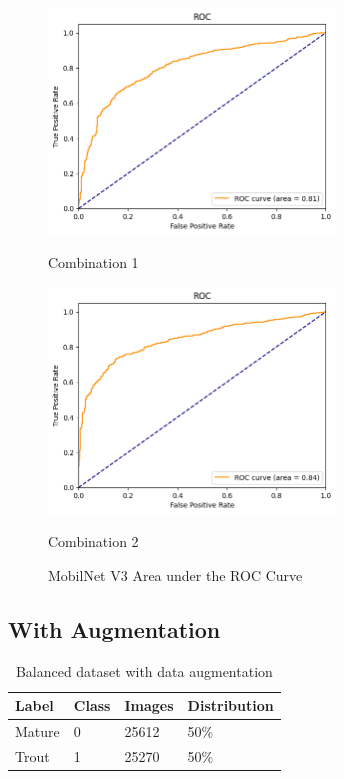 \begin{figure}[H]
    \centering
    \begin{minipage}[b]{0.49\textwidth}
        \centering
        \includegraphics[width=\textwidth, height=6cm]{Figures/balanced_data/less_data/withoutbn/mn3/roc.png}
        \captionsetup{labelformat=empty}
        \caption{Combination 1}
        \label{fig:u_wo_r_roc}
    \end{minipage}
    \hfill
    \begin{minipage}[b]{0.49\textwidth}
        \centering
        \includegraphics[width=\textwidth, height=6cm]{Figures/balanced_data/less_data/withbn/mn3/roc.png}
        \captionsetup{labelformat=empty}
        \caption{Combination 2}
        \label{fig:u_w_r_roc}
    \end{minipage}
    \captionsetup{labelformat=default}
    \caption{MobilNet V3 Area under the ROC Curve}
\end{figure}

\subsection{With Augmentation}

\begin{table}[H]
\centering
\begin{tabularx}{\textwidth}{@{} *4{X} @{}}
\toprule
\textbf{Label} & \textbf{Class} & \textbf{Images} & \textbf{Distribution}\\
\midrule
    Mature     & 0 & 25612 & 50\%  \\[1.3ex]
    Trout    &  1 & 25270 & 50\% \\[1.3ex]
\bottomrule
\end{tabularx}
\caption{Balanced dataset with data augmentation}
\label{table:data_type3}
\end{table}

